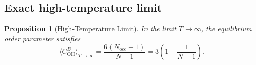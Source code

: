 \documentclass[12pt, a4paper]{article}
\theoremstyle{plain}
\newtheorem{proposition}{Proposition}[section]
\theoremstyle{definition}
\newcommand{\COH}{C_\mathrm{OH}^B}
\newcommand{\eps}{\varepsilon}
\newcommand{\Nocc}{N_\mathrm{occ}}
\newcommand{\Tstar}{T^*}
\newcommand{\avgE}[1]{\langle #1 \rangle}
\begin{document}


\subsection{Exact high-temperature limit}

\begin{proposition}[High-Temperature Limit]
\label{prop:highT}
In the limit $T \to \infty$, the equilibrium order parameter
satisfies
\begin{equation}
    \langle \COH \rangle_{T\to\infty}
    = \frac{6(\Nocc - 1)}{N - 1} = 3\left(1-\frac{1}{N-1}\right).
    \label{eq:highT_limit}
\end{equation}
\end{proposition}
\end{document}
